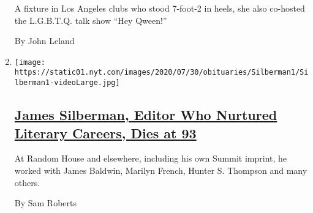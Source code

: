 \begin{enumerate}
  A fixture in Los Angeles clubs who stood 7-foot-2 in heels, she also
  co-hosted the L.G.B.T.Q. talk show ``Hey Qween!''

  By John Leland
\item
  \texttt{[image: https://static01.nyt.com/images/2020/07/30/obituaries/Silberman1/Silberman1-videoLarge.jpg]}

  \hypertarget{james-silberman-editor-who-nurtured-literary-careers-dies-at-93}{%
  \subsection{\texorpdfstring{\href{/2020/08/01/books/james-silberman-dead.html}{James
  Silberman, Editor Who Nurtured Literary Careers, Dies at
  93}}{James Silberman, Editor Who Nurtured Literary Careers, Dies at 93}}\label{james-silberman-editor-who-nurtured-literary-careers-dies-at-93}}

  At Random House and elsewhere, including his own Summit imprint, he
  worked with James Baldwin, Marilyn French, Hunter S. Thompson and many
  others.

  By Sam Roberts
\end{enumerate}

